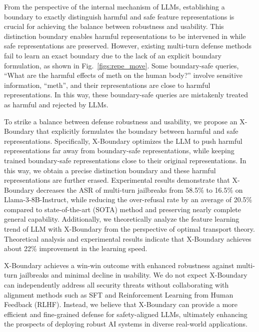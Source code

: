 From the perspective of the internal mechanism of LLMs, establishing a boundary to exactly distinguish harmful and safe feature representations is crucial for achieving the balance between robustness and usability.
% 
This distinction boundary enables harmful representations to be intervened in while safe representations are preserved.
%
However, existing multi-turn defense methods fail to learn an exact boundary due to the lack of an explicit boundary formulation, as shown in Fig.~\ref{figs:repe_move}.
%
Some boundary-safe queries, \eg ``What are the harmful effects of meth on the human body?'' involve sensitive information, \eg ``meth'', and their representations are close to harmful representations.
%
In this way, these boundary-safe queries are mistakenly treated as harmful and rejected by LLMs.

To strike a balance between defense robustness and usability, we propose an X-Boundary that explicitly formulates the boundary between harmful and safe representations.
% 
Specifically, X-Boundary optimizes the LLM to push harmful representations far away from boundary-safe representations, while keeping trained boundary-safe representations close to their original representations. 
%
In this way, we obtain a precise distinction boundary and these harmful representations are further erased.
%
Experimental results demonstrate that X-Boundary decreases the ASR of multi-turn jailbreaks from 58.5\% to 16.5\% on Llama-3-8B-Instruct, while reducing the over-refusal rate by an average of 20.5\% compared to state-of-the-art (SOTA) method and preserving nearly complete general capability.
%
Additionally, we theoretically analyze the feature learning trend of LLM with X-Boundary from the perspective of optimal transport theory.
%
Theoretical analysis and experimental results indicate that X-Boundary achieves about 22\% improvement in the learning speed.

X-Boundary achieves a win-win outcome with enhanced robustness against multi-turn jailbreaks and minimal decline in usability.
% 
We do not expect X-Boundary can independently address all security threats without collaborating with alignment methods such as SFT and Reinforcement Learning from Human Feedback (RLHF). 
%
Instead, we believe that X-Boundary can provide a more efficient and fine-grained defense for safety-aligned LLMs, ultimately enhancing the prospects of deploying robust AI systems in diverse real-world applications.